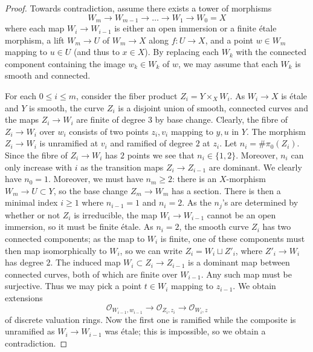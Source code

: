 \begin{proof}
Towards contradiction, assume there exists a tower of morphisms 
$$
W_m \to W_{m-1} \to \dots \to W_1 \to W_0 = X
$$
where each map $W_i \to W_{i - 1}$ is either an open immersion or a
finite \'etale morphism, a lift $W_m \to U$ of $W_m \to X$ along
$f : U \to X$, and a point $w \in W_m$ mapping to $u \in U$
(and thus to $x \in X$). By replacing each $W_k$ with the connected
component containing the image $w_k \in W_k$ of $w$, we may assume
that each $W_k$ is smooth and connected.

\medskip\noindent
For each $0 \le i \le m$, consider the fiber product $Z_i = Y \times_X W_i$.
As $W_i \to X$ is \'etale and $Y$ is smooth, the curve $Z_i$ is a disjoint
union of smooth, connected curves and the maps $Z_i \to W_i$ are finite
of degree $3$ by base change. Clearly, the fibre of $Z_i \to W_i$
over $w_i$ consists of two points $z_i, v_i$ mapping to $y, u$ in $Y$.
The morphism $Z_i \to W_i$ is unramified at $v_i$ and ramified of degree $2$
at $z_i$. Let $n_i = \#\pi_0(Z_i)$. Since the fibre of $Z_i \to W_i$
has $2$ points we see that $n_i \in \{1, 2\}$. Moreover, $n_i$ can only
increase with $i$ as the transition maps $Z_i \to Z_{i - 1}$ are dominant. 
We clearly have $n_0 = 1$. Moreover, we must have $n_m \geq 2$: there is an
$X$-morphism $W_m \to U \subset Y$, so the base change $Z_m \to W_m$
has a section. There is then a minimal index $i \ge 1$ where $n_{i - 1} = 1$
and $n_i = 2$. As the $n_j$'s are determined by whether or not $Z_i$
is irreducible, the map $W_i \to W_{i - 1}$ cannot be an open immersion,
so it must be finite \'etale. As $n_i = 2$, the smooth curve $Z_i$
has two connected components; as the map to $W_i$ is finite, one of
these components must then map isomorphically to $W_i$,
so we can write $Z_i = W_i \sqcup Z'_i$, where $Z'_i \to W_i$ has degree $2$.
The induced map $W_i \subset Z_i \to Z_{i - 1}$ is a dominant map
between connected curves, both of which are finite over $W_{i - 1}$.
Any such map must be surjective. Thus we may pick a point $t \in W_i$
mapping to $z_{i - 1}$. We obtain extensions 
$$
\mathcal{O}_{W_{i - 1}, w_{i - 1}} \to
\mathcal{O}_{Z_i, z_i} \to
\mathcal{O}_{W_i, z}
$$
of discrete valuation rings. Now the first one is ramified while
the composite is unramified as $W_i \to W_{i - 1}$ was \'etale; this is
impossible, so we obtain a contradiction.
\end{proof}











